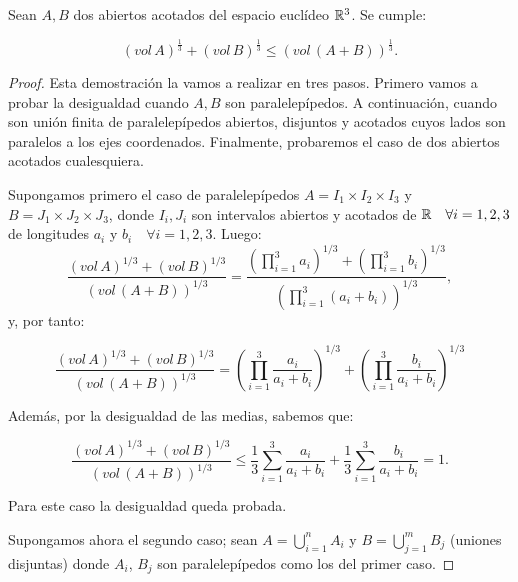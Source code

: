 \begin{theorem}
Sean $A, B$ dos abiertos acotados del espacio euclídeo $\mathbb{R}^3$. Se cumple:

\begin{equation*}
    (vol \, A)^{\frac{1}{3}} + (vol \, B)^{\frac{1}{3}} \leq (vol \, (A+B))^{\frac{1}{3}}.
\end{equation*}
\end{theorem}
\begin{proof}
Esta demostración la vamos a realizar en tres pasos. Primero vamos a probar la desigualdad cuando $A,B$ son paralelepípedos. A continuación, cuando son unión finita de paralelepípedos abiertos, disjuntos y acotados cuyos lados son paralelos a los ejes coordenados. Finalmente, probaremos el caso de dos abiertos acotados cualesquiera.

Supongamos primero el caso de paralelepípedos $A = I_1 \times I_2 \times I_3$ y $B = J_1 \times J_2 \times J_3$, donde $I_i,J_i$ son intervalos abiertos y acotados de $\mathbb{R} \quad \forall i=1,2,3$ de longitudes $a_i$ y $b_i \quad \forall i=1,2,3$. Luego:
%
\begin{equation*}
    \frac{ \left(vol \, A \right)^{1/3} + \left(vol \, B \right)^{1/3}}{\left(vol \, (A+B) \right)^{1/3}} = \frac{\left(\displaystyle\prod_{i=1}^3 a_i \right)^{1/3} + \left(\displaystyle\prod_{i=1}^3 b_i \right)^{1/3}}{\left(\displaystyle\prod_{i=1}^3 (a_i+b_i) \right)^{1/3}},
\end{equation*}
%
y, por tanto:

\begin{equation*}
    \frac{ \left(vol \, A \right)^{1/3} + \left(vol \, B \right)^{1/3}}{\left(vol \, (A+B) \right)^{1/3}} = \left(\displaystyle\prod_{i=1}^3 \frac{a_i}{a_i+b_i} \right)^{1/3} + \left(\displaystyle\prod_{i=1}^3 \frac{b_i}{a_i+b_i} \right)^{1/3}
\end{equation*}

Además, por la desigualdad de las medias, sabemos que:

\begin{equation*}
    \frac{ \left(vol \, A \right)^{1/3} + \left(vol \, B \right)^{1/3}}{\left(vol \, (A+B) \right)^{1/3}} \leq
    \frac{1}{3} \displaystyle\sum_{i=1}^3 \frac{a_i}{a_i+b_i} + \frac{1}{3} \displaystyle\sum_{i=1}^3 \frac{b_i}{a_i+b_i} = 1.
\end{equation*}

Para este caso la desigualdad queda probada.

Supongamos ahora el segundo caso; sean $A = \displaystyle\bigcup_{i=1}^n A_i$ y $B = \displaystyle\bigcup_{j=1}^m B_j$ (uniones disjuntas) donde $A_i$, $B_j$ son paralelepípedos como los del primer caso.


\end{proof}
